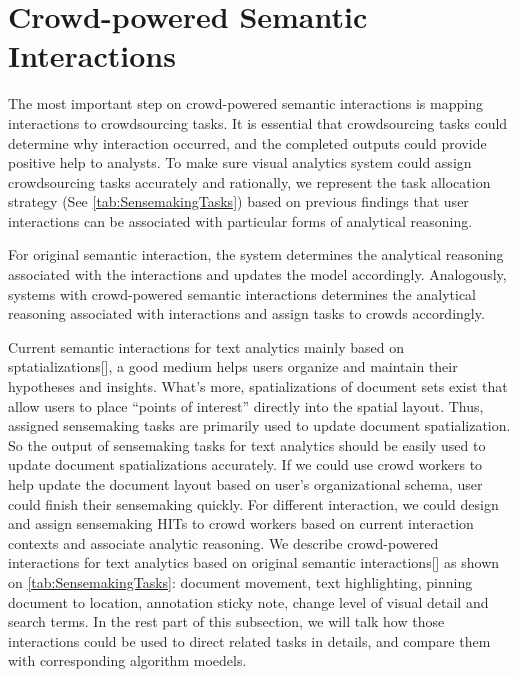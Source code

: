 \documentclass[journal]{vgtc}                %
\begin{document}
\section{Crowd-powered Semantic Interactions}




The most important step on crowd-powered semantic interactions is mapping interactions to crowdsourcing tasks. It is essential that crowdsourcing tasks could determine why interaction occurred, and the completed outputs could provide positive help to analysts. To make sure visual analytics system could assign crowdsourcing tasks accurately and rationally, we represent the task allocation strategy (See \autoref{tab:SensemakingTasks}) based on previous findings\cite{andrews2010space} that user interactions can be associated with particular forms of analytical reasoning.


For original semantic interaction, the system determines the analytical reasoning associated with the interactions and updates the model accordingly\cite{Endert2012V}. Analogously, systems with crowd-powered semantic interactions  determines the analytical reasoning associated with interactions and assign tasks to crowds accordingly.

Current semantic interactions for text analytics mainly based on sptatializations[], a good medium helps users organize and maintain their hypotheses and insights. What's more,   spatializations of document sets exist that allow users to place “points of interest” directly into the spatial layout. Thus, assigned sensemaking tasks are primarily used to update document spatialization. So the output of sensemaking tasks for text analytics should be easily used to update document spatializations accurately. If we could use crowd workers to help update the document layout based on user's organizational schema, user could finish their sensemaking quickly. For different interaction, we could design and assign sensemaking HITs to crowd workers based on current interaction contexts and associate analytic reasoning. We describe crowd-powered interactions for text analytics based on original semantic interactions[] as shown on \autoref{tab:SensemakingTasks}: document movement, text highlighting, pinning document to location, annotation sticky note, change level of visual detail and search terms. In the rest part of this subsection, we will talk how those interactions could be used to direct related tasks in details, and compare them with corresponding algorithm moedels.
\end{document}
